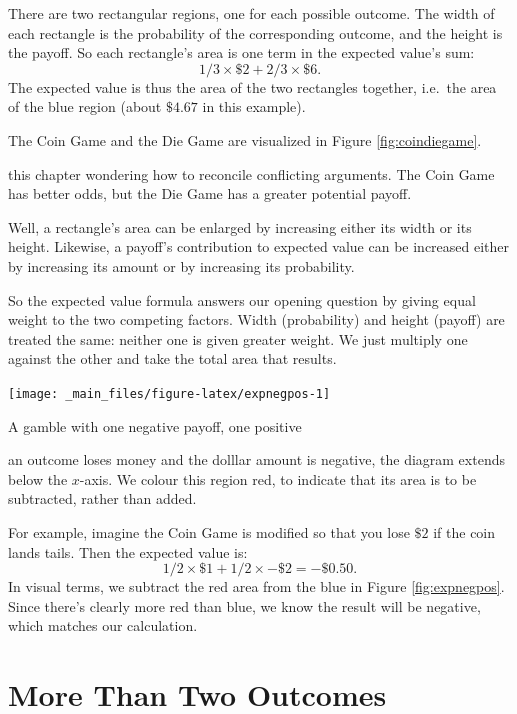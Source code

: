 \documentclass[justified]{tufte-book}
\theoremstyle{definition}
\theoremstyle{definition}
\theoremstyle{definition}
\theoremstyle{definition}
\theoremstyle{remark}
\begin{document}
There are two rectangular regions, one for each possible outcome. The width of each rectangle is the probability of the corresponding outcome, and the height is the payoff. So each rectangle's area is one term in the expected value's sum:
\[ 1/3 \times \$2 + 2/3 \times \$6. \]
The expected value is thus the area of the two rectangles together, i.e.~the area of the blue region (about \(\$4.67\) in this example).

The Coin Game and the Die Game are visualized in Figure \ref{fig:coindiegame}.

 this chapter wondering how to reconcile conflicting arguments. The Coin Game has better odds, but the Die Game has a greater potential payoff.

Well, a rectangle's area can be enlarged by increasing either its width or its height. Likewise, a payoff's contribution to expected value can be increased either by increasing its amount or by increasing its probability.

So the expected value formula answers our opening question by giving equal weight to the two competing factors. Width (probability) and height (payoff) are treated the same: neither one is given greater weight. We just multiply one against the other and take the total area that results.

\begin{marginfigure}
\texttt{[image: \_main\_files/figure-latex/expnegpos-1]} \caption[A gamble with one negative payoff, one positive]{A gamble with one negative payoff, one positive}\label{fig:expnegpos}
\end{marginfigure}

 an outcome loses money and the dolllar amount is negative, the diagram extends below the \(x\)-axis. We colour this region red, to indicate that its area is to be subtracted, rather than added.

For example, imagine the Coin Game is modified so that you lose \(\$2\) if the coin lands tails. Then the expected value is:
\[ 1/2 \times \$1 + 1/2 \times -\$2 = -\$0.50.\]
In visual terms, we subtract the red area from the blue in Figure \ref{fig:expnegpos}. Since there's clearly more red than blue, we know the result will be negative, which matches our calculation.

\hypertarget{more-than-two-outcomes}{%
\section{More Than Two Outcomes}\label{more-than-two-outcomes}}
\end{document}
